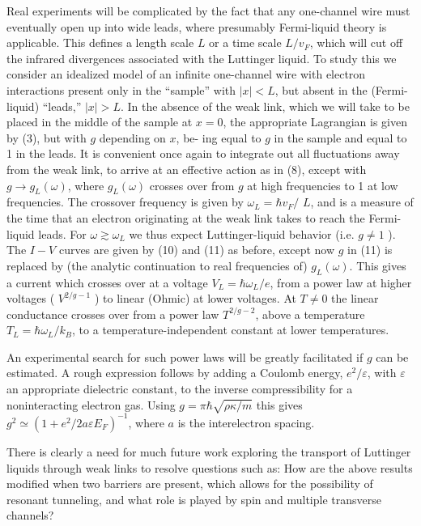 \documentclass[11pt]{article}
\begin{document}
Real experiments will be complicated by the fact that any one-channel wire must eventually open up into wide leads, where presumably Fermi-liquid theory is applicable. This defines a length scale $L$ or a time scale $L / v_{F}$, which will cut off the infrared divergences associated with the Luttinger liquid. To study this we consider an idealized model of an infinite one-channel wire with electron interactions present only in the ``sample'' with $|x|<L$, but absent in the (Fermi-liquid) ``leads,'' $|x|>L$. In the absence of the weak link, which we will take to be placed in the middle of the sample at $x=0$, the appropriate Lagrangian is given by (3), but with $g$ depending on $x$, be- ing equal to $g$ in the sample and equal to 1 in the leads. It is convenient once again to integrate out all fluctuations away from the weak link, to arrive at an effective action as in (8), except with $g \rightarrow g_{L}(\omega)$, where $g_{L}(\omega)$ crosses over from $g$ at high frequencies to 1 at low frequencies. The crossover frequency is given by $\omega_{L}=\hbar v_{F} /$ $L$, and is a measure of the time that an electron originating at the weak link takes to reach the Fermi-liquid leads. For $\omega \gtrsim \omega_{L}$ we thus expect Luttinger-liquid behavior (i.e. $g \neq 1$ ). The $I-V$ curves are given by (10) and (11) as before, except now $g$ in (11) is replaced by (the analytic continuation to real frequencies of) $g_{L}(\omega)$. This gives a current which crosses over at a voltage $V_{L}=\hbar \omega_{L} / e$, from a power law at higher voltages ( $V^{2 / g-1}$ ) to linear (Ohmic) at lower voltages. At $T \neq 0$ the linear conductance crosses over from a power law $T^{2 / g-2}$, above a temperature $T_{L}=\hbar \omega_{L} / k_{B}$, to a temperature-independent constant at lower temperatures.

An experimental search for such power laws will be greatly facilitated if $g$ can be estimated. A rough expression follows by adding a Coulomb energy, $e^{2} / \varepsilon$, with $\varepsilon$ an appropriate dielectric constant, to the inverse compressibility for a noninteracting electron gas. Using \cite{ref11} $g=\pi \hbar \sqrt{\rho \kappa / m}$ this gives $g^{2} \simeq\left(1+e^{2} / 2 a \varepsilon E_{F}\right)^{-1}$, where $a$ is the interelectron spacing.

There is clearly a need for much future work exploring the transport of Luttinger liquids through weak links to resolve questions such as: How are the above results modified when two barriers are present, which allows for the possibility of resonant tunneling, and what role is played by spin and multiple transverse channels?
\end{document}

